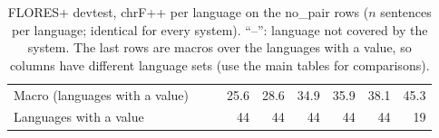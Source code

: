 \begin{table}[t]
\begin{tabular}{@{}llrrrrrrr@{}}
\midrule
Macro (languages with a value) & & & 25.6 & 28.6 & 34.9 & 35.9 & 38.1 & 45.3 \\
Languages with a value & & & 44 & 44 & 44 & 44 & 44 & 19 \\
\bottomrule
\end{tabular}
\caption{FLORES+ devtest, chrF++ per language on the no\_pair rows ($n$ sentences per language; identical for every system). ``--'': language not covered by the system. The last rows are macros over the languages with a value, so columns have different language sets (use the main tables for comparisons).}
\label{tab:full-flores-chrfpp}
\end{table}
